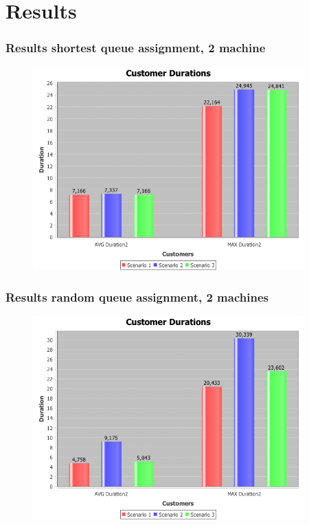 \documentclass{beamer}
\begin{document}
\section{Results}
\begin{frame}
\frametitle{Results shortest queue assignment, 2 machine}
\begin{figure}
\centering
\includegraphics[width=0.93\textwidth]{results/out_2_random_false.png}
\end{figure}
\end{frame}

\begin{frame}
\frametitle{Results random queue assignment, 2 machines}
\begin{figure}
\centering
\includegraphics[width=0.93\textwidth]{results/out_2_random_true.png}
\end{figure}
\end{frame}
\end{document}
